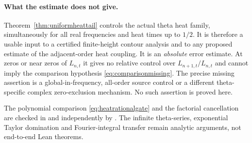 \paragraph{What the estimate does not give.}
Theorem~\ref{thm:uniformheattail} controls
the actual theta heat family, simultaneously
for all real frequencies and heat times up
to $1/2$. It is therefore a usable input
to a certified finite-height contour
analysis and to any proposed estimate of
the adjacent-order heat coupling.
It is an \emph{absolute} error estimate.
At zeros or near zeros of $L_{n,t}$
it gives no relative control over
$L_{n+1,t}/L_{n,t}$ and cannot imply
the comparison hypothesis
\eqref{eq:comparisonmissing}.
The precise missing assertion is a
global-in-frequency, all-order source
control or a different theta-specific
complex zero-exclusion mechanism.
No such assertion is proved here.

The polynomial comparison
\eqref{eq:heatrationalgate} and the
factorial cancellation are checked in
and independently by
.
The infinite theta-series, exponential
Taylor domination and Fourier-integral
transfer remain analytic arguments,
not end-to-end Lean theorems.
